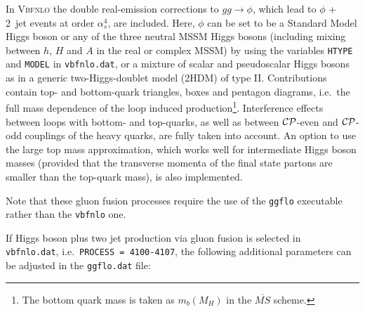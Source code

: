 \documentclass[english,12pt]{article}
\begin{document}
In \textsc{Vbfnlo} the double real-emission corrections to $gg\to \phi$,  which
lead to $\phi$ + 2~jet events at order $\alpha_s^{4}$, are
included\cite{Campanario:2010mi}. Here, $\phi$ can be set to be a Standard Model
Higgs boson or any of the three neutral MSSM Higgs bosons (including mixing
between $h$, $H$ and $A$ in the real or complex MSSM) by using the variables
{\tt HTYPE} and {\tt MODEL} in {\tt vbfnlo.dat}, or a mixture of scalar and
pseudoscalar Higgs bosons as in a generic two-Higgs-doublet model (2HDM) of type
II.  Contributions contain top- and bottom-quark triangles, boxes and pentagon
diagrams, i.e.\ the full mass dependence of the loop induced
production\footnote{The bottom quark mass is taken as $m_{b}(M_{H})$ in the $\overline{MS}$ scheme.}.
Interference effects between loops with bottom- and top-quarks, as well as
between ${\cal{CP}}$-even and ${\cal{CP}}$-odd couplings of the heavy quarks,
are fully taken into account. An option to use the large top mass approximation,
which works well for intermediate Higgs boson masses (provided that the
transverse momenta of the final state partons are smaller than the top-quark
mass), is also implemented.

Note that these gluon fusion processes require the use of the {\tt ggflo}
executable rather than the {\tt vbfnlo} one.
  
If Higgs boson plus two jet production via gluon fusion is selected in {\tt
vbfnlo.dat}, i.e.\ {\tt PROCESS = 4100-4107}, the following additional
parameters can be adjusted in the {\tt ggflo.dat} file:
\end{document}
